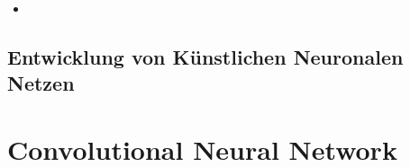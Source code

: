 \documentclass[12pt,a4paper]{scrartcl}
\numberwithin{equation}{section}
\begin{document}
\begin{itemize}
	\item  
\end{itemize}

\subsection{Entwicklung von Künstlichen Neuronalen Netzen } \label{Entwicklung}



\section{Convolutional Neural Network}
\end{document}
